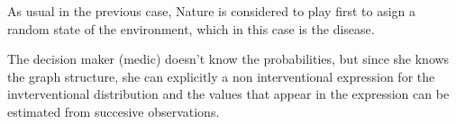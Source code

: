 \documentclass{article}
\begin{document}
As usual in the previous case, Nature is considered to play first to asign a random state of the environment, which in this case is the disease.

The decision maker (medic) doesn't know the probabilities, but since she knows the graph structure, she can explicitly a non interventional expression for the invterventional distribution and the values that appear in the expression can be estimated from succesive observations.



\end{document}
